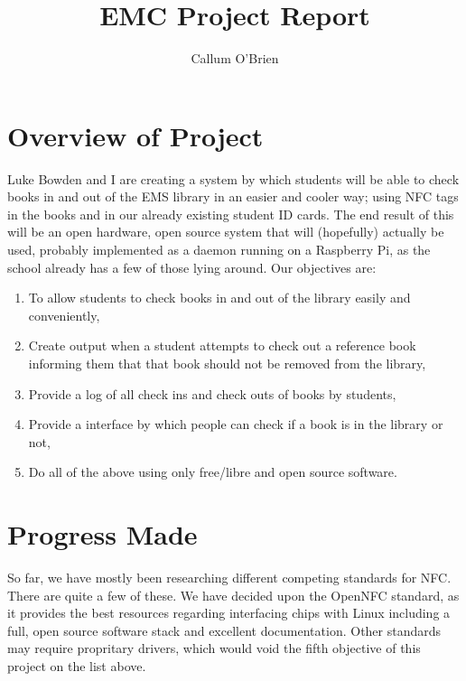 \documentclass{article}
\begin{document}
\title{EMC Project Report}
\author{Callum O'Brien}
\maketitle

\section{Overview of Project}

Luke Bowden and I are creating a system by which students will be able to check books in and out of the EMS library in an easier and cooler way; using NFC tags in the books and in our already existing student ID cards. The end result of this will be an open hardware, open source system that will (hopefully) actually be used, probably implemented as a daemon running on a Raspberry Pi, as the school already has a few of those lying around. Our objectives are:\begin{enumerate}

    \item To allow students to check books in and out of the library easily and conveniently,

    \item Create output when a student attempts to check out a reference book informing them that that book should not be removed from the library,

    \item Provide a log of all check ins and check outs of books by students,

    \item Provide a interface by which people can check if a book is in the library or not,

    \item Do all of the above using only free/libre and open source software.

\end{enumerate}

\section{Progress Made}

So far, we have mostly been researching different competing standards for NFC. There are quite a few of these. We have decided upon the OpenNFC standard, as it provides the best resources regarding interfacing chips with Linux including a full, open source software stack and excellent documentation. Other standards may require propritary drivers, which would void the fifth objective of this project on the list above.
\end{document}
